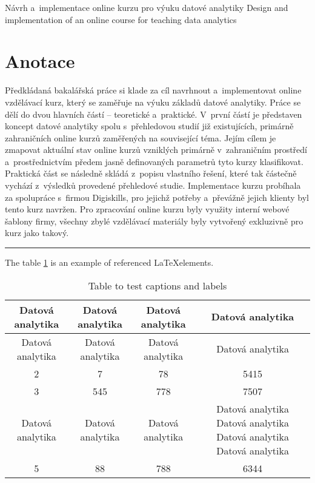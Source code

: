 Návrh a~implementace online kurzu pro výuku datové analytiky Design and
implementation of an online course for teaching data analytics

\chapter*{Anotace}

Předkládaná bakalářská práce si klade za cíl navrhnout a~implementovat
online vzdělávací kurz, který se zaměřuje na výuku základů datové
analytiky. Práce se dělí do dvou hlavních částí -- teoretické
a~praktické. V~první částí je představen koncept datové analytiky spolu
s~přehledovou studií již existujících, primárně zahraničních online kurzů
zaměřených na související téma. Jejím cílem je zmapovat aktuální stav
online kurzů vzniklých primárně v~zahraničním prostředí
a~prostřednictvím předem jasně definovaných parametrů tyto kurzy
klasifikovat. Praktická část se následně skládá z~popisu vlastního
řešení, které tak částečně vychází z~výsledků provedené přehledové
studie. Implementace kurzu probíhala za spolupráce s~firmou Digiskills,
pro jejichž potřeby a~převážně jejich klienty byl tento kurz navržen.
Pro zpracování online kurzu byly využity interní webové šablony firmy,
všechny zbylé vzdělávací materiály byly vytvořený exkluzivně pro kurz
jako takový.

\begin{center}\rule{0.5\linewidth}{0.5pt}\end{center}

The table \ref{table:1} is an example of referenced \LaTeX elements.

\begin{table}[h!]
\centering
\begin{tabular}{||c c c c||} 
 \hline
 Datová analytika & Datová analytika & Datová analytika & Datová analytika \\ [0.5ex] 
 \hline\hline
 Datová analytika & Datová analytika & Datová analytika & Datová analytika \\ 
 2 & 7 & 78 & 5415 \\
 3 & 545 & 778 & 7507 \\
 Datová analytika & Datová analytika & Datová analytika & Datová analytika Datová analytika Datová analytika Datová analytika \\
 5 & 88 & 788 & 6344 \\ [1ex] 
 \hline
\end{tabular}
\caption{Table to test captions and labels}
\label{table:1}
\end{table}

